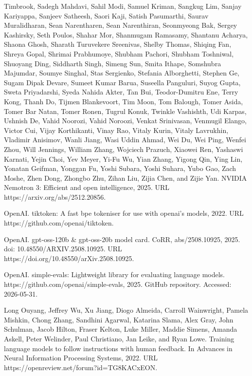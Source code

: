 \documentclass[
  10
]{article}
\begin{document}
Timbrook, Sadegh Mahdavi, Sahil Modi, Samuel Kriman, Sangkug Lim, Sanjay
Kariyappa, Sanjeev Satheesh, Saori Kaji, Satish Pasumarthi, Saurav
Muralidharan, Sean Narentharen, Sean Narenthiran, Seonmyeong Bak, Sergey
Kashirsky, Seth Poulos, Shahar Mor, Shanmugam Ramasamy, Shantanu
Acharya, Shaona Ghosh, Sharath Turuvekere Sreenivas, Shelby Thomas,
Shiqing Fan, Shreya Gopal, Shrimai Prabhumoye, Shubham Pachori, Shubham
Toshniwal, Shuoyang Ding, Siddharth Singh, Simeng Sun, Smita Ithape,
Somshubra Majumdar, Soumye Singhal, Stas Sergienko, Stefania
Alborghetti, Stephen Ge, Sugam Dipak Devare, Sumeet Kumar Barua,
Suseella Panguluri, Suyog Gupta, Sweta Priyadarshi, Syeda Nahida Akter,
Tan Bui, Teodor-Dumitru Ene, Terry Kong, Thanh Do, Tijmen Blankevoort,
Tim Moon, Tom Balough, Tomer Asida, Tomer Bar Natan, Tomer Ronen, Tugrul
Konuk, Twinkle Vashishth, Udi Karpas, Ushnish De, Vahid Noorozi, Vahid
Noroozi, Venkat Srinivasan, Venmugil Elango, Victor Cui, Vijay
Korthikanti, Vinay Rao, Vitaly Kurin, Vitaly Lavrukhin, Vladimir
Anisimov, Wanli Jiang, Wasi Uddin Ahmad, Wei Du, Wei Ping, Wenfei Zhou,
Will Jennings, William Zhang, Wojciech Prazuch, Xiaowei Ren, Yashaswi
Karnati, Yejin Choi, Yev Meyer, Yi-Fu Wu, Yian Zhang, Yigong Qin, Ying
Lin, Yonatan Geifman, Yonggan Fu, Yoshi Subara, Yoshi Suhara, Yubo Gao,
Zach Moshe, Zhen Dong, Zhongbo Zhu, Zihan Liu, Zijia Chen, and Zijie
Yan. NVIDIA Nemotron 3: Efficient and open intelligence, 2025. URL
https://arxiv.org/abs/2512.20856.

OpenAI. tiktoken: A fast bpe tokeniser for use with openai's models,
2022. URL https://github.com/openai/tiktoken.

OpenAI. gpt-oss-120b \& gpt-oss-20b model card. CoRR, abs/2508.10925,
2025. doi: 10.48550/ARXIV.2508.10925. URL
https://doi.org/10.48550/arXiv.2508.10925.



OpenAI. simple-evals: Lightweight library for evaluating language
models. https://github.com/openai/simple-evals, 2025. GitHub
repository. Accessed: 2026-05-31.

Long Ouyang, Jeffrey Wu, Xu Jiang, Diogo Almeida, Carroll Wainwright,
Pamela Mishkin, Chong Zhang, Sandhini Agarwal, Katarina Slama, Alex
Gray, John Schulman, Jacob Hilton, Fraser Kelton, Luke Miller, Maddie
Simens, Amanda Askell, Peter Welinder, Paul Christiano, Jan Leike, and
Ryan Lowe. Training language models to follow instructions with human
feedback. In Advances in Neural Information Processing Systems, 2022.
URL https://openreview.net/forum?id=TG8KACxEON.
\end{document}
